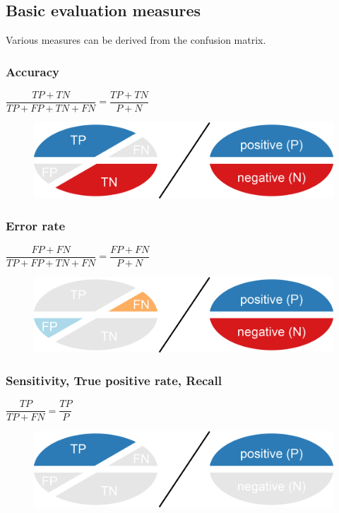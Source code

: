 %
%

%
%
\subsection{Basic evaluation measures}
Various measures can be derived from the confusion matrix.

%
%
\subsubsection*{Accuracy}

$\dfrac{TP+TN}{TP+FP+TN+FN} = \dfrac{TP+TN}{P+N} $
\begin{figure}[H]
  \centering
      \includegraphics[width=0.4 \textwidth]{fig07/accuracy.png}
\end{figure}

%
%
\subsubsection*{Error rate}

$\dfrac{FP+FN}{TP+FP+TN+FN}= \dfrac{FP+FN}{P+N} $

\begin{figure}[H]
  \centering
      \includegraphics[width=0.4 \textwidth]{fig07/error-rate.png}
\end{figure}

%
%
\subsubsection*{Sensitivity, True positive rate, Recall}

$\dfrac{TP}{TP+FN}= \dfrac{TP}{P} $

\begin{figure}[H]
  \centering
      \includegraphics[width=0.4 \textwidth]{fig07/sensitivity.png}
\end{figure}

